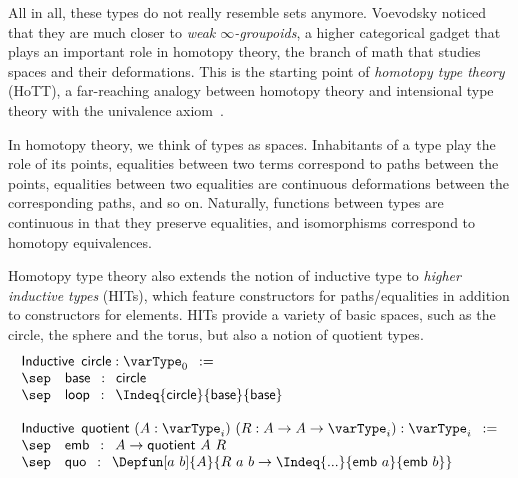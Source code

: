 All in all, these types do not really resemble sets anymore. 
% 
Voevodsky noticed that they are much closer to \emph{weak \( \infty \)-groupoids}, 
a higher categorical gadget that plays an important role in homotopy theory, 
the branch of math that studies spaces and their deformations.
% 
This is the starting point of \emph{homotopy type theory} (HoTT), a far-reaching analogy
between homotopy theory and intensional type theory with the univalence 
axiom~\cite{hottbook}.

In homotopy theory, we think of types as spaces. Inhabitants of a type 
play the role of its points, equalities between two terms correspond to paths
between the points, equalities between two equalities are continuous
deformations between the corresponding paths, and so on. 
% 
Naturally, functions between types are continuous in that they preserve
equalities, and isomorphisms correspond to homotopy equivalences.

Homotopy type theory also extends the notion of inductive type to 
\emph{higher inductive types} (HITs), which feature constructors for paths/equalities
in addition to constructors for elements.
% 
HITs provide a variety of basic spaces, such as the circle, the sphere and
the torus, but also a notion of quotient types.
% 
\[
\begin{array}{l}
\mathsf{Inductive}\enskip\mathsf{circle} : \varType_0\enskip := \\
\sep \quad \mathsf{base} \enskip : \enskip \mathsf{circle}\\
\sep \quad \mathsf{loop} \enskip : \enskip \Indeq{\mathsf{circle}}{\mathsf{base}}{\mathsf{base}} \\
\\
\mathsf{Inductive}\enskip\mathsf{quotient}\ (A : \varType_i)\ (R : A \to A \to \varType_i) : \varType_i\enskip := \\
\sep \quad \mathsf{emb} \enskip : \enskip A \to \mathsf{quotient}\ A\ R \\
\sep \quad \mathsf{quo} \enskip : \enskip \Depfun[a\ b]{A}{R\ a\ b \to \Indeq{...}{\mathsf{emb}\ a}{\mathsf{emb}\ b}} \\
\end{array}
\]

